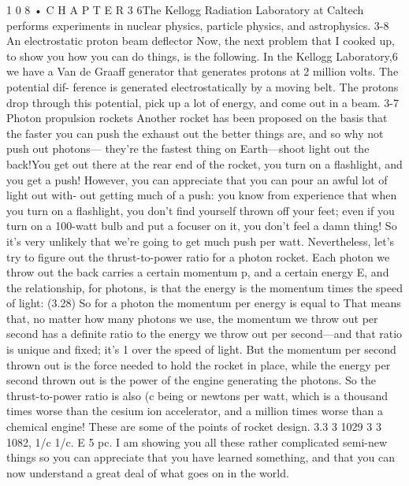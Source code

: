 \documentclass[10pt,oneside]{article}
\begin{document}
1 0 8 • C H A P T E R  3 6The Kellogg Radiation Laboratory at Caltech performs experiments in nuclear physics, particle physics, and astrophysics. 3-8 An electrostatic proton beam deflector Now, the next problem that I cooked up, to show you how you can do things, is the following. In the Kellogg Laboratory,6 we have a Van de Graaff generator that generates protons at 2 million volts. The potential dif- ference is generated electrostatically by a moving belt. The protons drop through this potential, pick up a lot of energy, and come out in a beam. 3-7 Photon propulsion rockets Another rocket has been proposed on the basis that the faster you can push the exhaust out the better things are, and so why not push out photons--- they’re the fastest thing on Earth---shoot light out the back!You get out there at the rear end of the rocket, you turn on a flashlight, and you get a push! However, you can appreciate that you can pour an awful lot of light out with- out getting much of a push: you know from experience that when you turn on a flashlight, you don’t find yourself thrown off your feet; even if you turn on a 100-watt bulb and put a focuser on it, you don’t feel a damn thing! So it’s very unlikely that we’re going to get much push per watt. Nevertheless, let’s try to figure out the thrust-to-power ratio for a photon rocket. Each photon we throw out the back carries a certain momentum p, and a certain energy E, and the relationship, for photons, is that the energy is the momentum times the speed of light: (3.28) So for a photon the momentum per energy is equal to That means that, no matter how many photons we use, the momentum we throw out per second has a definite ratio to the energy we throw out per second---and that ratio is unique and fixed; it’s 1 over the speed of light. But the momentum per second thrown out is the force needed to hold the rocket in place, while the energy per second thrown out is the power of the engine generating the photons. So the thrust-to-power ratio is also (c being or newtons per watt, which is a thousand times worse than the cesium ion accelerator, and a million times worse than a chemical engine! These are some of the points of rocket design. 3.3 3 1029 3 3 1082, 1/c 1/c. E 5 pc. I am showing you all these rather complicated semi-new things so you can appreciate that you have learned something, and that you can now understand a great deal of what goes on in the world.\par
\end{document}
